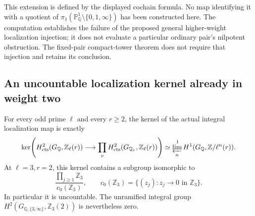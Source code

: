 This extension is defined by the displayed cochain formula.
No map identifying it with a quotient of
\(\pi_1(\mathbb P^1_{\mathbb Q}\setminus\{0,1,\infty\})\)
has been constructed here. The computation establishes the
failure of the proposed general higher-weight localization
injection; it does not evaluate a particular ordinary pair's
nilpotent obstruction. The fixed-pair compact-tower theorem
does not require that injection and retains its conclusion.

\subsection{An uncountable localization kernel already in weight two}
\label{sec:ghost-uncountable-kernel}

\begin{proposition}
\label{prop:ghost-uncountable-kernel}
For every odd prime \(\ell\) and every \(r\geq2\), the
kernel of the actual integral localization map is exactly
\[
 \ker\!\left(H^2_{\rm cts}(G_{\mathbb Q},\mathbb Z_\ell(r))
       \longrightarrow\prod_v H^2_{\rm cts}
                   (G_{\mathbb Q_v},\mathbb Z_\ell(r))\right)
 \simeq\varprojlim_n^{\,1}H^1
                (G_{\mathbb Q},\mathbb Z/\ell^n(r)).
\]
At \(\ell=3,r=2\), this kernel contains a subgroup isomorphic
to
\[
 \frac{\prod_{j\geq1}\mathbb Z_3}
      {c_0(\mathbb Z_3)},\qquad
 c_0(\mathbb Z_3)=
 \{(z_j):z_j\longrightarrow0\text{ in }\mathbb Z_3\}.
\]
In particular it is uncountable. The unramified integral group
\(H^2(G_{\mathbb Q,\{3,\infty\}},\mathbb Z_3(2))\)
is nevertheless zero.
\end{proposition}
